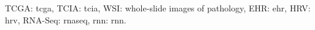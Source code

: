 \documentclass[
paper=landscape,
paper=160mm:90mm, %
fontsize=11pt, %
pagesize, %
parskip=half-, %
]{scrartcl} %
\newcommand{\bcaption}[2]{\caption{\textbf{#1} #2}}
\newcommand{\bcaption}[2]{\caption{\textbf{#1} #2}}
\theoremstyle{mythmstyle} %
\begin{document}
{\begin{minipage}[c]{0.95\linewidth}
\begin{figure}[H]
\end{figure}
\footnotesize 
TCGA: \acrlong{tcga},
TCIA: \acrlong{tcia},
WSI: whole-slide images of pathology,
EHR: \acrlong{ehr}, HRV: \acrlong{hrv},
RNA-Seq: \acrlong{rnaseq},
\acrshort{rnn}: \acrlong{rnn}. 
\end{minipage}
%



\clearpage



}
\end{document}
